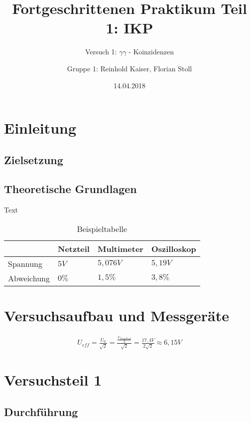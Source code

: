 \documentclass[11pt]{scrartcl}
\title{Fortgeschrittenen Praktikum Teil 1: IKP}
\subtitle{Versuch 1: $\gamma \gamma$ - Koinzidenzen}
\author{Gruppe 1: Reinhold Kaiser, Florian Stoll}
\date{14.04.2018}
\begin{document}
\maketitle
\newpage
\tableofcontents
\newpage

\section{Einleitung}

\subsection{Zielsetzung}


\subsection{Theoretische Grundlagen}

Text 

\begin{table}
	\caption{Beispieltabelle}
	\begin{tabular}{|l|l|l|l|}
	\hline
	 & Netzteil & Multimeter & Oszilloskop \\ \hline
	Spannung & $5V$ & $ 5,076 V $ & $ 5,19 V $ \\ \hline
	Abweichung & $0\%$ & $1,5\%$ & $3,8\%$ \\ \hline
	\end{tabular}
\label{tab1}
\end{table}

\section{Versuchsaufbau und Messgeräte}

\begin{align}
U_{eff} = \frac{U_0}{\sqrt{2}} = \frac{\frac{U_{PeakPeak}}{2}}{\sqrt{2}} = \frac{17,4 V}{ 2 \sqrt{2}} \approx 6,15 V
\end{align}




\section{Versuchsteil 1}


\subsection{Durchführung}
\end{document}

